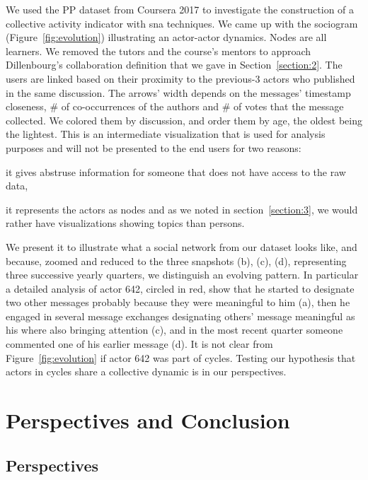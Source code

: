 \documentclass[a4paper,twoside]{article}
\begin{document}
We used the PP dataset from Coursera 2017 to investigate the construction of a collective activity indicator with \gls{sna} techniques.  We came up with the sociogram (Figure~\ref{fig:evolution}) illustrating an actor-actor dynamics.  Nodes are all learners.  We removed the tutors and the course's mentors to approach Dillenbourg's collaboration definition that we gave in Section~\ref{section:2}.  The users are linked based on their proximity to the previous-3 actors who published in the same discussion.  The arrows' width depends on the messages' timestamp closeness, \# of co-occurrences of the authors and \# of votes that the message collected.  We colored them by discussion, and order them by age, the oldest being the lightest.  This is an intermediate visualization that is used for analysis purposes and will not be presented to the end users for two reasons:
\begin{inparaenum}
\item it gives abstruse information for someone that does not have access to the raw data,
\item it represents the actors as nodes and as we noted in section~\ref{section:3}, we would rather have visualizations showing topics than persons.
\end{inparaenum}
We present it to illustrate what a social network from our dataset looks like, and because, zoomed and reduced to the three snapshots (b), (c), (d), representing three successive yearly quarters, we distinguish an evolving pattern.  In particular a detailed analysis of actor 642, circled in red, show that he started to designate two other messages probably because they were meaningful to him (a), then he engaged in several message exchanges designating others' message meaningful as his where also bringing attention (c), and in the most recent quarter someone commented one of his earlier message (d).  It is not clear from Figure~\ref{fig:evolution} if actor 642 was part of cycles.  Testing our hypothesis that actors in cycles share a collective dynamic is in our perspectives.

\section{Perspectives and Conclusion}
\label{section:6}

\subsection{Perspectives}
\end{document}
